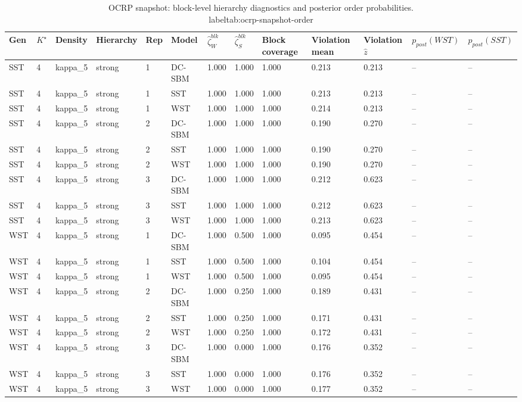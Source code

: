 \begin{table}[!h]
\centering
\caption{OCRP snapshot: block-level hierarchy diagnostics and posterior order probabilities.\\label{tab:ocrp-snapshot-order}}
\centering
\begin{tabular}[t]{lllllllllllll}
\toprule
Gen & $K^\star$ & Density & Hierarchy & Rep & Model & $\widehat\zeta_W^{blk}$ & $\widehat\zeta_S^{blk}$ & Block coverage & Violation mean & Violation $\hat z$ & $p_{post}(WST)$ & $p_{post}(SST)$\\
\midrule
SST & 4 & kappa_5 & strong & 1 & DC-SBM & 1.000 & 1.000 & 1.000 & 0.213 & 0.213 & -- & --\\
SST & 4 & kappa_5 & strong & 1 & SST & 1.000 & 1.000 & 1.000 & 0.213 & 0.213 & -- & --\\
SST & 4 & kappa_5 & strong & 1 & WST & 1.000 & 1.000 & 1.000 & 0.214 & 0.213 & -- & --\\
SST & 4 & kappa_5 & strong & 2 & DC-SBM & 1.000 & 1.000 & 1.000 & 0.190 & 0.270 & -- & --\\
SST & 4 & kappa_5 & strong & 2 & SST & 1.000 & 1.000 & 1.000 & 0.190 & 0.270 & -- & --\\
SST & 4 & kappa_5 & strong & 2 & WST & 1.000 & 1.000 & 1.000 & 0.190 & 0.270 & -- & --\\
SST & 4 & kappa_5 & strong & 3 & DC-SBM & 1.000 & 1.000 & 1.000 & 0.212 & 0.623 & -- & --\\
SST & 4 & kappa_5 & strong & 3 & SST & 1.000 & 1.000 & 1.000 & 0.212 & 0.623 & -- & --\\
SST & 4 & kappa_5 & strong & 3 & WST & 1.000 & 1.000 & 1.000 & 0.213 & 0.623 & -- & --\\
WST & 4 & kappa_5 & strong & 1 & DC-SBM & 1.000 & 0.500 & 1.000 & 0.095 & 0.454 & -- & --\\
WST & 4 & kappa_5 & strong & 1 & SST & 1.000 & 0.500 & 1.000 & 0.104 & 0.454 & -- & --\\
WST & 4 & kappa_5 & strong & 1 & WST & 1.000 & 0.500 & 1.000 & 0.095 & 0.454 & -- & --\\
WST & 4 & kappa_5 & strong & 2 & DC-SBM & 1.000 & 0.250 & 1.000 & 0.189 & 0.431 & -- & --\\
WST & 4 & kappa_5 & strong & 2 & SST & 1.000 & 0.250 & 1.000 & 0.171 & 0.431 & -- & --\\
WST & 4 & kappa_5 & strong & 2 & WST & 1.000 & 0.250 & 1.000 & 0.172 & 0.431 & -- & --\\
WST & 4 & kappa_5 & strong & 3 & DC-SBM & 1.000 & 0.000 & 1.000 & 0.176 & 0.352 & -- & --\\
WST & 4 & kappa_5 & strong & 3 & SST & 1.000 & 0.000 & 1.000 & 0.176 & 0.352 & -- & --\\
WST & 4 & kappa_5 & strong & 3 & WST & 1.000 & 0.000 & 1.000 & 0.177 & 0.352 & -- & --\\
\bottomrule
\end{tabular}
\end{table}
